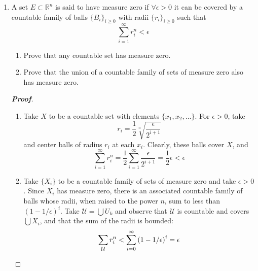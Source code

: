 \documentclass[12pt,leqno]{book}
\theoremstyle{definition}
\newenvironment{Proof}{\begin{proof}[\textnormal{\textbf{Proof}}]}{\end{proof}}
\begin{document}
\begin{enumerate}
\begin{Proof}
Since $f$ is uniformly continuous and $x_n\to x_0$, we can choose $n$ so that $|f(x)-f(x_n)|<\frac{\epsilon}{2}$. Further, since $f(x_n)\to L$, we can choose $n$ sufficiently large so that $|f(x_n)-L|<\frac{\epsilon}{2}$. Thus, we can choose $n$ sufficiently large so that \begin{align*}|f(x)-L|&=|f(x)-f(x_n)+f(x_n)-L|\\&\leq|f(x)-f(x_n)|+|f(x_n)-L|\\&<\frac{\epsilon}{2}+\frac{\epsilon}{2}=\epsilon\end{align*} In particular, this shows $\lim_{x\to x_0}f(x)=L$ and moreover that the limit $L$ is independent of the sequence chosen. 

We will now show that $\hat{f}$ is a continuous function. Take $\{x_n\}$ a sequence in $\overline{E}$ and notice that \[|\hat{f}(x_n)-\hat{f}(x_0)|=\left|\lim_{x\to x_n}f(x)-\lim_{x\to x_0}f(x)\right|\] For sufficiently large $n$, the expression on the right is arbitrarily small, hence $\hat{f}(x_n)\to\hat{f}(x_0)$. Thus, $\hat{f}$ is continuous on $\overline{E}$. 
\end{Proof}

\item A set $E\subset\mathbb{R}^n$ is said to have measure zero if $\forall\epsilon>0$ it can be covered by a countable family of balls $\{B_i\}_{i\geq0}$ with radii $\{r_i\}_{i\geq0}$ such that \[\sum_{i=1}^{\infty}r_i^n<\epsilon\] 
\begin{enumerate}
 \item Prove that any countable set has measure zero.
 \item Prove that the union of a countable family of sets of measure zero also has measure zero.
\end{enumerate}

\begin{Proof}
\begin{enumerate}
 \item Take $X$ to be a countable set with elements $\{x_1,x_2,\hdots\}$. For $\epsilon>0$, take \[r_i=\frac{1}{2}\sqrt[n]{\frac{\epsilon}{2^{i+1}}}\] and center balls of radius $r_i$ at each $x_i$. Clearly, these balls cover $X$, and \[\sum_{i=1}^{\infty}r_i^n=\frac{1}{2}\sum_{i=1}^{\infty}\frac{\epsilon}{2^{i+1}}=\frac{1}{2}\epsilon<\epsilon\]
 \item Take $\{X_i\}$ to be a countable family of sets of measure zero and take $\epsilon>0$. Since $X_i$ has measure zero, there is an associated countable family of balls whose radii, when raised to the power $n$, sum to less than $\left(1-1/\epsilon\right)^i$. Take $\mathcal{U}=\bigcup U_k$ and observe that $\mathcal{U}$ is countable and covers $\bigcup X_i$, and that the sum of the radii is bounded: \[\sum_{\mathcal{U}}r_i^n<\sum_{i=0}^{\infty}\left(1-1/\epsilon\right)^i=\epsilon\qedhere\]
\end{enumerate}
\end{Proof}


\end{enumerate}
\end{document}
